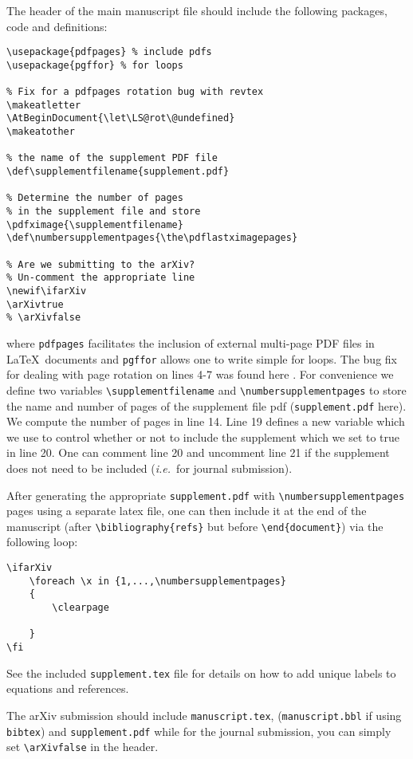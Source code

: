 \documentclass[10pt,twocolumn,prl,aps,floatfix,superscriptaddress,longbibliography]{revtex4-1}
\def\supplementfilename{supplement.pdf}
\def\numbersupplementpages{\the\pdflastximagepages}
\newif\ifarXiv
\begin{document}
The header of the main manuscript file should include the following packages,
 code and definitions:
%
\begin{lstlisting}
\usepackage{pdfpages} % include pdfs
\usepackage{pgffor} % for loops

% Fix for a pdfpages rotation bug with revtex
\makeatletter
\AtBeginDocument{\let\LS@rot\@undefined}
\makeatother

% the name of the supplement PDF file
\def\supplementfilename{supplement.pdf}

% Determine the number of pages 
% in the supplement file and store
\pdfximage{\supplementfilename}
\def\numbersupplementpages{\the\pdflastximagepages}

% Are we submitting to the arXiv? 
% Un-comment the appropriate line
\newif\ifarXiv
\arXivtrue 
% \arXivfalse
\end{lstlisting}
%
where \texttt{pdfpages} facilitates the inclusion of external multi-page PDF
files in \LaTeX~documents \cite{pdfpages} and \texttt{pgffor} allows one
to write simple for loops.  The bug fix for dealing with page rotation on lines
4-7 was found here \cite{rotate}. For convenience we define two variables
\verb!\supplementfilename! and \verb!\numbersupplementpages! to store the name
and number of pages of the supplement file pdf (\texttt{supplement.pdf} here).
We compute the number of pages in line 14. Line 19 defines a new variable which
we use to control whether or not to include the supplement which we set to true
in line 20.  One can comment line 20 and uncomment line 21 if the supplement
does not need to be included (\emph{i.e.}~for journal submission).

After generating the appropriate \texttt{supplement.pdf} with
\verb!\numbersupplementpages! pages using a
separate latex file, one can then include it at the end of the manuscript
(after \texttt{\textbackslash bibliography\{refs\}} but before 
\texttt{\textbackslash end\{document\}}) via the following loop: \\ 
%
\begin{lstlisting}
\ifarXiv
    \foreach \x in {1,...,\numbersupplementpages}
    {
        \clearpage
        
    }
\fi
\end{lstlisting}
%
See the included \texttt{supplement.tex} file for details on how to add unique
labels to equations and references.

The arXiv submission should include \texttt{manuscript.tex},
(\texttt{manuscript.bbl} if using \texttt{bibtex}) and
\texttt{supplement.pdf} while for the journal submission, you can simply
set \verb!\arXivfalse! in the header.



\ifarXiv
    \foreach \x in {1,...,\numbersupplementpages}
    {
        \clearpage
        
    }
\fi
\end{document}

